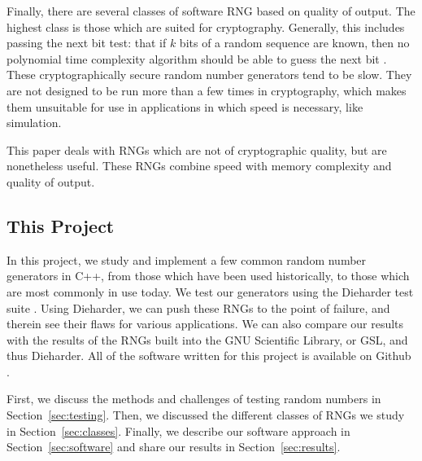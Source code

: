 Finally, there are several classes of software RNG based on quality of output. The highest class is those which are suited for cryptography. Generally, this includes passing the next bit test: that if $k$ bits of a random sequence are known, then no polynomial time complexity algorithm should be able to guess the next bit \cite{Yao_1982}. These cryptographically secure random number generators tend to be slow. They are not designed to be run more than a few times in cryptography, which makes them unsuitable for use in applications in which speed is necessary, like simulation.

This paper deals with RNGs which are not of cryptographic quality, but are nonetheless useful. These RNGs combine speed with memory complexity and quality of output.

\subsection{This Project}
In this project, we study and implement a few common random number generators in C++, from those which have been used historically, to those which are most commonly in use today. We test our generators using the Dieharder test suite \cite{dieharder_website}. Using Dieharder, we can push these RNGs to the point of failure, and therein see their flaws for various applications. We can also compare our results with the results of the RNGs built into the GNU Scientific Library, or GSL, and thus Dieharder. All of the software written for this project is available on Github \cite{github_repo}.

First, we discuss the methods and challenges of testing random numbers in Section~\ref{sec:testing}. Then, we discussed the different classes of RNGs we study in Section~\ref{sec:classes}. Finally, we describe our software approach in Section~\ref{sec:software} and share our results in Section~\ref{sec:results}.
